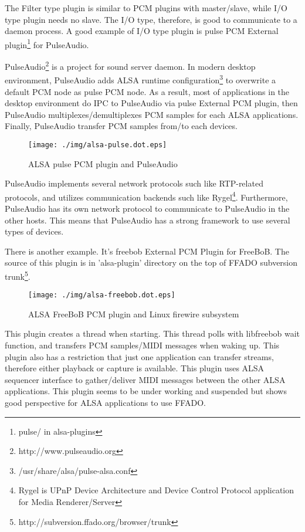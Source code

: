\documentclass[onecolumn]{article}
\begin{document}
The Filter type plugin is similar to PCM plugins with master/slave, while I/O type plugin needs no slave. The I/O type, therefore, is good to communicate to a daemon process. A good example of I/O type plugin is pulse PCM External plugin\footnote{pulse/ in alsa-plugins} for PulseAudio.

PulseAudio\footnote{http://www.pulseaudio.org} is a project for sound server daemon. In modern desktop environment, PulseAudio adds ALSA runtime configuration\footnote{/usr/share/alsa/pulse-alsa.conf} to overwrite a default PCM node as pulse PCM node. As a result, most of applications in the desktop environment do IPC to PulseAudio via pulse External PCM plugin, then PulseAudio multiplexes/demultiplexes PCM samples for each ALSA applications. Finally, PulseAudio transfer PCM samples from/to each devices.

\begin{figure}[H]
	\centering
	\texttt{[image: ./img/alsa-pulse.dot.eps]}
	\caption{ALSA pulse PCM plugin and PulseAudio}
	\label{alsa-pulse}
\end{figure}

PulseAudio implements several network protocols such like RTP-related protocols, and utilizes communication backends such like Rygel\footnote{Rygel is UPnP Device Architecture and Device Control Protocol application for Media Renderer/Server}. Furthermore, PulseAudio has its own network protocol to communicate to PulseAudio in the other hosts. This means that PulseAudio has a strong framework to use several types of devices.

There is another example. It's freebob External PCM Plugin for FreeBoB. The source of this plugin is in 'alsa-plugin' directory on the top of FFADO subversion trunk\footnote{http://subversion.ffado.org/browser/trunk}.

\begin{figure}[H]
	\centering
	\texttt{[image: ./img/alsa-freebob.dot.eps]}
	\caption{{ALSA FreeBoB PCM plugin and Linux firewire subsystem}}
	\label{alsa_freebob}
\end{figure}

This plugin creates a thread when starting. This thread polls with libfreebob wait function, and transfers PCM samples/MIDI messages when waking up. This plugin also has a restriction that just one application can transfer streams, therefore either playback or capture is available. This plugin uses ALSA sequencer interface to gather/deliver MIDI messages between the other ALSA applications. This plugin seems to be under working and suspended but shows good perspective for ALSA applications to use FFADO.
\end{document}
